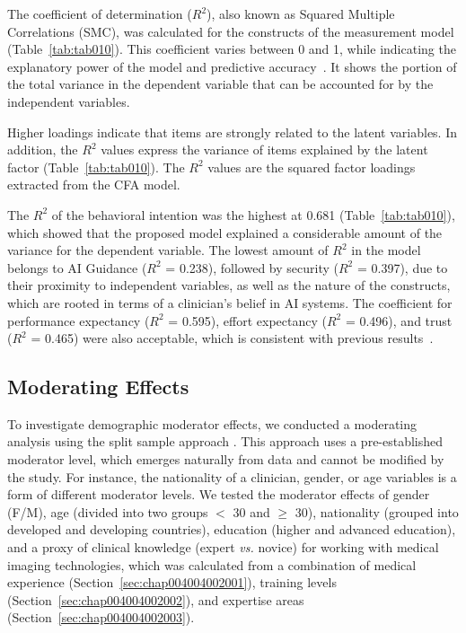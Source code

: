 The coefficient of determination ($R^2$), also known as Squared Multiple Correlations (SMC), was calculated for the constructs of the measurement model (Table~\ref{tab:tab010}).
This coefficient varies between 0 and 1, while indicating the explanatory power of the model and predictive accuracy~\cite{doi:10.1080/10705511.2017.1401932}.
It shows the portion of the total variance in the dependent variable that can be accounted for by the independent variables.

Higher loadings indicate that items are strongly related to the latent variables.
In addition, the $R^2$ values express the variance of items explained by the latent factor (Table~\ref{tab:tab010}).
The $R^2$ values are the squared factor loadings extracted from the CFA model.



The $R^2$ of the behavioral intention was the highest at 0.681 (Table~\ref{tab:tab010}), which showed that the proposed model explained a considerable amount of the variance for the dependent variable.
The lowest amount of $R^2$ in the model belongs to AI Guidance ($R^2$ = 0.238), followed by security ($R^2$ = 0.397), due to their proximity to independent variables, as well as the nature of the constructs, which are rooted in terms of a clinician's belief in AI systems.
The coefficient for performance expectancy ($R^2$ = 0.595), effort expectancy ($R^2$ = 0.496), and trust ($R^2$ = 0.465) were also acceptable, which is consistent with previous results~\cite{KHALILZADEH2017460}.

\subsection{Moderating Effects}
\label{sec:chap004005004}

To investigate demographic moderator effects, we conducted a moderating analysis using the split sample approach \cite{LI2021106581, LI2021106929}.
This approach uses a pre-established moderator level, which emerges naturally from data and cannot be modified by the study.
For instance, the nationality of a clinician, gender, or age variables is a form of different moderator levels.
We tested the moderator effects of gender (F/M), age (divided into two groups $<$ 30 and $\geq$ 30), nationality (grouped into developed and developing countries), education (higher and advanced education), and a proxy of clinical knowledge (expert {\it vs.} novice) for working with medical imaging technologies, which was calculated from a combination of medical experience (Section~\ref{sec:chap004004002001}), training levels (Section~\ref{sec:chap004004002002}), and expertise areas (Section~\ref{sec:chap004004002003}).

